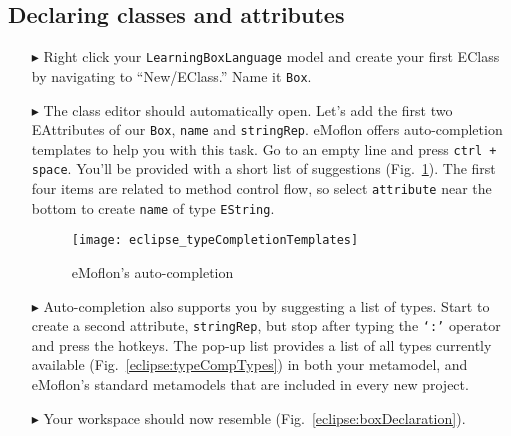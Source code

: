 \newpage
\hypertarget{static:classes tex}{}
\subsection{Declaring classes and attributes}
\texHeader

\begin{itemize}

\item[$\blacktriangleright$] Right click your \texttt{LearningBoxLanguage} model and create your first EClass by navigating to ``New/EClass.'' Name it
\texttt{Box}.

\vspace{0.5cm}

\item[$\blacktriangleright$] The class editor should automatically open. Let's add the first two EAttributes of our \texttt{Box}, \texttt{name} and
\texttt{stringRep}. eMoflon offers auto-completion templates to help you with this task. Go to an empty line and press \texttt{ctrl + space}. You'll be provided
with a short list of suggestions (Fig.~\ref{eclipse:typeCompTempl}). The first four items are related to method control flow, so select \texttt{attribute} near
the bottom to create \texttt{name} of type \texttt{EString}.

\vspace{0.5cm}

\begin{figure}[htbp]
	\centering
  \texttt{[image: eclipse\_typeCompletionTemplates]}
	\caption{eMoflon's auto-completion}
	\label{eclipse:typeCompTempl}
\end{figure} 

\vspace{0.5cm}

\item[$\blacktriangleright$] Auto-completion also supports you by suggesting a list of types. Start to create a second attribute, \texttt{stringRep}, but
stop after typing the \texttt{`:'} operator and press the hotkeys. The pop-up list provides a list of all types currently available
(Fig.~\ref{eclipse:typeCompTypes}) in both your metamodel, and eMoflon's standard metamodels that are included in every new project.

\vspace{0.5cm}

\item[$\blacktriangleright$] Your workspace should now resemble (Fig.~\ref{eclipse:boxDeclaration}).


\end{itemize}
